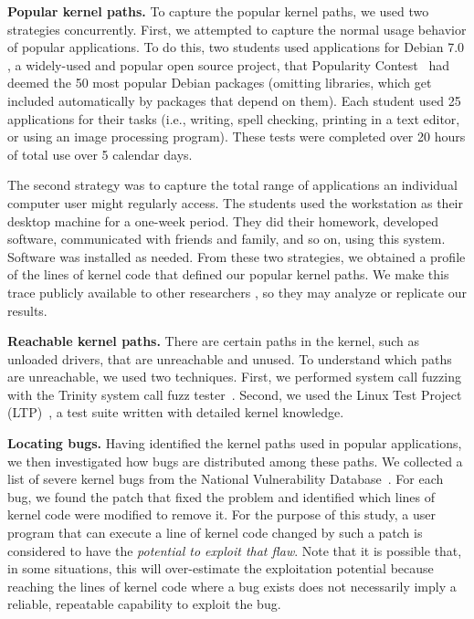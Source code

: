\textbf{Popular kernel paths.}
To capture the popular kernel paths, we used two strategies concurrently.
First, we attempted to capture the normal usage behavior of popular applications.
To do this, two students used applications for Debian 7.0 , a widely-used and popular open source project,
that Popularity Contest~\cite{Top-Packages} had deemed the 50 most popular Debian
packages (omitting libraries, which get included automatically by packages that depend on them).
Each student used 25 applications for their
tasks (i.e., writing, spell checking, printing in a text editor, or using
an image processing program).
These tests were completed over 20 hours of
total use over 5 calendar days.

The second strategy was to capture the total range of applications an
individual computer user might regularly access. The students used the workstation as their
desktop machine for a one-week period. They did their homework, developed
software, communicated with friends and family, and so on, using this
system.  Software was installed as needed.
%
From these two strategies, we obtained a profile of the lines of
kernel code that defined our popular kernel paths.  We make this trace
publicly available to other researchers \redact, so they may analyze or
replicate our results.

\textbf{Reachable kernel paths.}
There are certain paths in the kernel, such as unloaded drivers, that are
unreachable and unused.
To understand which paths are unreachable, we used two techniques.  First,
we performed system call fuzzing with the Trinity
system call fuzz tester~\cite{Trinity}.
Second, we used the Linux Test Project (LTP)~\cite{LTP}, a test suite written
with detailed kernel knowledge.
%

\textbf{Locating bugs.}
Having identified the kernel paths used in popular applications,
we then investigated how bugs are distributed among these paths. We collected a list of
severe kernel bugs from the National Vulnerability Database~\cite{NVD}.
For each bug, we found the patch that fixed the problem and identified
which lines of kernel code were modified to remove it.
For the purpose of this study, a user program that can execute a line of kernel
code changed by such a patch is considered to have the \textit{potential to
exploit that flaw}.  Note that it is possible that, in some situations,
this will over-estimate the exploitation potential because reaching the lines of kernel code where a
bug exists does not necessarily imply a reliable, repeatable capability to
exploit the bug.

